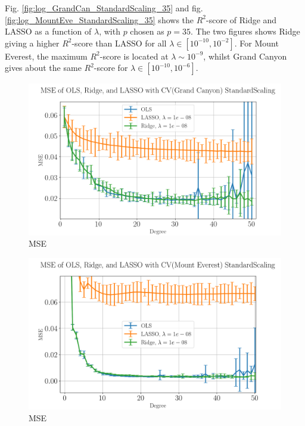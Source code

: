 \documentclass[%
reprint,
amsmath,amssymb,
aps,
pra,
]{revtex4-2}
\begin{document}
Fig. \ref{fig:log_GrandCan_StandardScaling_35} and fig. \ref{fig:log_MountEve_StandardScaling_35} shows the \(R^2\)-score of Ridge and LASSO as a function of \(\lambda\), with \(p\) chosen as \(p=35\). The two figures shows Ridge giving a higher \(R^2\)-score than LASSO for all \(\lambda\in[10^{-10}, 10^{-2}]\). For Mount Everest, the maximum \(R^2\)-score is located at \(\lambda\sim 10^{-9}\), whilst Grand Canyon gives about the same \(R^2\)-score for \(\lambda\in[10^{-10}, 10^{-6}]\).

\begin{figure}[ht!]
	\centering
	\includegraphics[width=\linewidth]{Python/Figures/Terrain/MSE_GrandCanyon_StandardScaling_50.png}
	\caption{MSE}
	\label{fig:MSE_GrandCan_StandardScaling_50}
\end{figure}

\begin{figure}[ht!]
	\centering
	\includegraphics[width=\linewidth]{Python/Figures/Terrain/MSE_MountEverest_StandardScaling_50.png}
	\caption{MSE}
	\label{fig:MSE_MountEve_StandardScaling_50}
\end{figure}
\end{document}
